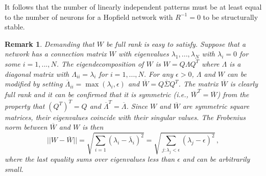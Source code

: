 \documentclass[12pt]{article}
\newtheorem{remark}[theorem]{Remark}
\begin{document}
It follows that the number of linearly independent patterns must be at least equal to the number of neurons for a Hopfield network with $R^{-1}=0$ to be structurally stable.

\begin{remark}
    Demanding that $W$ be full rank is easy to satisfy. Suppose that a network has a connection matrix $W$ with eigenvalues $\lambda_1,...,\lambda_N$ with $\lambda_i = 0$ for some $i = 1,...,N$. The eigendecomposition of $W$ is $W = Q \Lambda Q^T$ where $\Lambda$ is a diagonal matrix with $\Lambda_{ii} = \lambda_i$ for $i = 1,..., N$. For any $\epsilon > 0$, $\Lambda$ and $W$ can be modified by setting $\overline{\Lambda}_{ii} = \max(\lambda_i,\epsilon)$ and $\overline{W} = Q \overline{\Sigma} Q^T$. The matrix $\overline{W}$ is clearly full rank and it can be confirmed that it is symmetric (i.e., $\overline{W}^T = \overline{W}$) from the property that $(Q^T)^T = Q$ and $\overline{\Lambda}^T = \overline{\Lambda}$. Since $W$ and $\overline{W}$ are symmetric square matrices, their eigenvalues coincide with their singular values. The Frobenius norm between $\overline{W}$ and $W$ is then 
    \begin{equation*}
    || W - \overline{W}|| = \sqrt{\sum_{i=1}(\lambda_i - \overline{\lambda}_i)^2} = \sqrt{\sum_{j : \lambda_j < \epsilon}(\lambda_j-\epsilon)^2} \, ,
    \end{equation*}
    where the last equality sums over eigenvalues less than $\epsilon$ and can be arbitrarily small. 
\end{remark}
\end{document}
